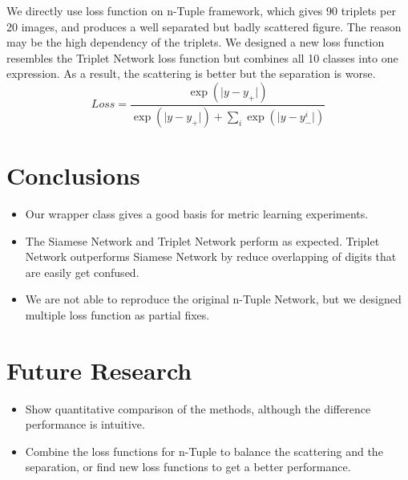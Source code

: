 \documentclass[a0,portrait]{a0poster}
\begin{document}
\begin{multicols}{2}
		We directly use loss function on n-Tuple framework, which gives 90 triplets per 20 images, and produces a well separated but badly scattered figure. The reason may be the high dependency of the triplets. We designed a new loss function resembles the Triplet Network loss function but combines all 10 classes into one expression. As a result, the scattering is better but the separation is worse.
		\begin{equation}
		Loss = \frac{\exp{(\lvert y-y_+ \rvert)}}{\exp{(\lvert y-y_+ \rvert)} + \sum_i\exp{(\lvert y-y_-^i \rvert)}}
		\end{equation}
		
		\color{SaddleBrown} %
		
		\section*{Conclusions}
		
		\begin{itemize}
			\item Our wrapper class gives a good basis for metric learning experiments.
			\item The Siamese Network and Triplet Network perform as expected. Triplet Network outperforms Siamese Network by reduce overlapping of digits that are easily get confused.
			\item We are not able to reproduce the original n-Tuple Network, but we designed multiple loss function as partial fixes.
		\end{itemize}
		
		\color{DarkSlateGray} %
		
		
		\section*{Future Research}
		
		\begin{itemize}
			\item Show quantitative comparison of the methods, although the difference performance is intuitive.
			\item Combine the loss functions for n-Tuple to balance the scattering and the separation, or find new loss functions to get a better performance.
		\end{itemize}
		
	\end{multicols}
\end{document}
